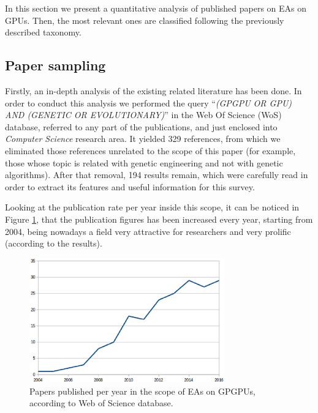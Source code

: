 \documentclass{article}
\begin{document}
In this section we present a quantitative analysis of published papers
on EAs on GPUs. Then, the most relevant ones are classified following
the previously described taxonomy. 

\subsection{Paper sampling} %

Firstly, an in-depth analysis of the existing related literature has been done. In order to conduct this analysis we performed the query ``\textit{(GPGPU OR GPU) AND (GENETIC OR EVOLUTIONARY)}'' in the Web Of Science (WoS) \cite{wos} database, referred to any part of the publications, and just enclosed into {\em Computer Science} research area. 
It yielded 329 references, from which we eliminated those references unrelated to the scope of this paper (for example, those whose topic is related with genetic engineering and not with genetic algorithms). After that removal, 194 results remain, which were carefully read in order to extract its features and useful information for this survey.  

Looking at the publication rate per year inside this scope, it can be noticed in Figure \ref{figure:publications}, that the publication figures has been increased every year, starting from 2004, being nowadays a field very attractive for researchers and very prolific (according to the results).

\begin{figure}[!ht]
\centering
\includegraphics[width=0.75\textwidth]{years.eps}
\caption{Papers published per year in the scope of EAs on GPGPUs, according to Web of Science database.}
\label{figure:publications}
\end{figure}
\end{document}
